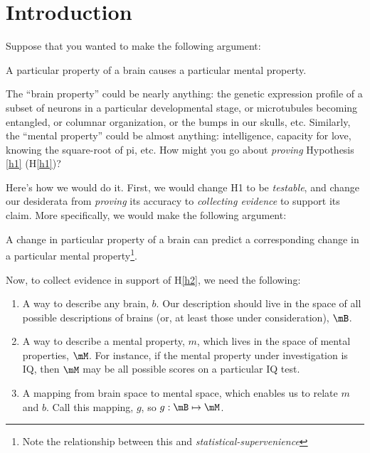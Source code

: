 %
%
%
%
%
%
%
%
%
%
%
%
%
%
%
%

\maketitle
\begin{abstract}
\end{abstract}

\section{Introduction} 

\label{sec:introduction}

Suppose that you wanted to make the following argument: 
\begin{hypo}
	\label{h1} A particular property of a brain causes a particular mental property. 
\end{hypo}

The ``brain property'' could be nearly anything: the genetic expression profile of a subset of neurons in a particular developmental stage, or microtubules becoming entangled, or columnar organization, or the bumps in our skulls, etc. Similarly, the ``mental property'' could be almost anything: intelligence, capacity for love, knowing the square-root of pi, etc. How might you go about \emph{proving} Hypothesis \ref{h1} (H\ref{h1})?

Here's how we would do it. First, we would change H1 to be \emph{testable}, and change our desiderata from \emph{proving} its accuracy to \emph{collecting evidence} to support its claim. More specifically, we would make the following argument:
\begin{hypo}
	\label{h2} A change in particular property of a brain can predict a corresponding change in a particular mental property\footnote{Note the relationship between this and \emph{statistical-supervenience}\cite{VogelsteinPriebe10}}. 
\end{hypo}

Now, to collect evidence in support of H\ref{h2}, we need the following:
\begin{enumerate}
	\item A way to describe any brain, $b$. Our description should live in the space of all possible descriptions of brains (or, at least those under consideration), $\mB$. 
	\item A way to describe a mental property, $m$, which lives in the space of mental properties, $\mM$. For instance, if the mental property under investigation is IQ, then $\mM$ may be all possible scores on a particular IQ test. 
	\item A mapping from brain space to mental space, which enables us to relate $m$ and $b$. Call this mapping, $g$, so $g: \mB \mapsto \mM$. 
\end{enumerate}

